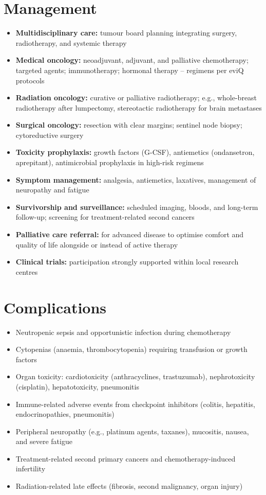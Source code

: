 \section*{Management}
\begin{itemize}
    \item \textbf{Multidisciplinary care:} tumour board planning integrating surgery, radiotherapy, and systemic therapy
    \item \textbf{Medical oncology:} neoadjuvant, adjuvant, and palliative chemotherapy; targeted agents; immunotherapy; hormonal therapy -- regimens per eviQ protocols
    \item \textbf{Radiation oncology:} curative or palliative radiotherapy; e.g., whole-breast radiotherapy after lumpectomy, stereotactic radiotherapy for brain metastases
    \item \textbf{Surgical oncology:} resection with clear margins; sentinel node biopsy; cytoreductive surgery
    \item \textbf{Toxicity prophylaxis:} growth factors (G-CSF), antiemetics (ondansetron, aprepitant), antimicrobial prophylaxis in high-risk regimens
    \item \textbf{Symptom management:} analgesia, antiemetics, laxatives, management of neuropathy and fatigue
    \item \textbf{Survivorship and surveillance:} scheduled imaging, bloods, and long-term follow-up; screening for treatment-related second cancers
    \item \textbf{Palliative care referral:} for advanced disease to optimise comfort and quality of life alongside or instead of active therapy
    \item \textbf{Clinical trials:} participation strongly supported within local research centres
\end{itemize}

\section*{Complications}
\begin{itemize}
    \item Neutropenic sepsis and opportunistic infection during chemotherapy
    \item Cytopenias (anaemia, thrombocytopenia) requiring transfusion or growth factors
    \item Organ toxicity: cardiotoxicity (anthracyclines, trastuzumab), nephrotoxicity (cisplatin), hepatotoxicity, pneumonitis
    \item Immune-related adverse events from checkpoint inhibitors (colitis, hepatitis, endocrinopathies, pneumonitis)
    \item Peripheral neuropathy (e.g., platinum agents, taxanes), mucositis, nausea, and severe fatigue
    \item Treatment-related second primary cancers and chemotherapy-induced infertility
    \item Radiation-related late effects (fibrosis, second malignancy, organ injury)
\end{itemize}

